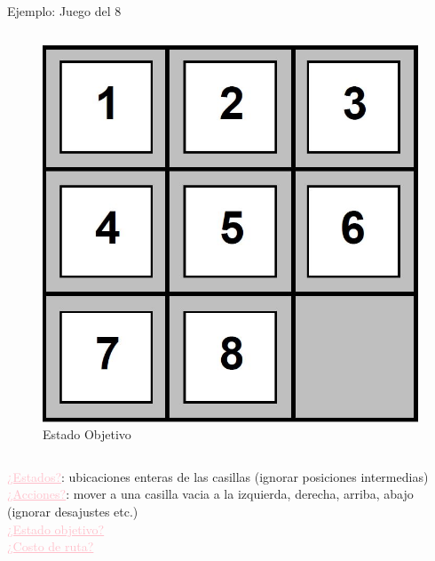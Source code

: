 \documentclass{beamer}
\theoremstyle{definition}
\theoremstyle{theorem}
\theoremstyle{remark}
\begin{document}
\begin{frame}{Ejemplo: Juego del 8}
\begin{columns}
        \begin{column}{0.5\textwidth}  %
            \begin{figure}
                \includegraphics[scale=.15]{21_grid2.JPG}
                \\
                \vspace{0pt}
                {\tiny Estado Objetivo}
            \end{figure}
        \end{column}
    \end{columns}
    \vfill
    \small{ 
        \textcolor{Pink}{\underline{¿Estados?}}: ubicaciones enteras de las casillas (ignorar posiciones intermedias)\\
        \textcolor{Pink}{\underline{¿Acciones?}}: mover a una casilla vacia a la izquierda, derecha, arriba, abajo (ignorar desajustes etc.)\\
        \textcolor{Pink}{\underline{¿Estado objetivo?}}\\
        \textcolor{Pink}{\underline{¿Costo de ruta?}}\\
    }
\end{frame}
\end{document}

